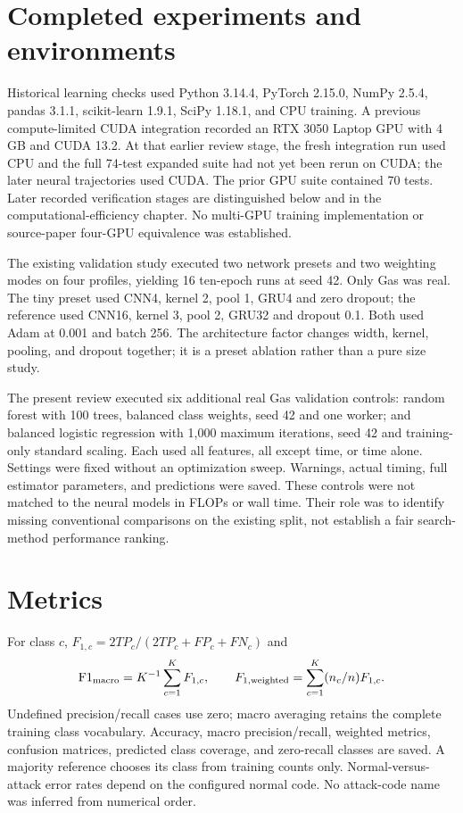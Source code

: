 \documentclass[11pt,a4paper]{report}
\begin{document}
\section{Completed experiments and environments}
Historical learning checks used Python 3.14.4, PyTorch 2.15.0, NumPy 2.5.4, pandas 3.1.1, scikit-learn 1.9.1, SciPy 1.18.1, and CPU training. A previous compute-limited CUDA integration recorded an RTX 3050 Laptop GPU with 4 GB and CUDA 13.2. At that earlier review stage, the fresh integration run used CPU and the full 74-test expanded suite had not yet been rerun on CUDA; the later neural trajectories used CUDA. The prior GPU suite contained 70 tests. Later recorded verification stages are distinguished below and in the computational-efficiency chapter. No multi-GPU training implementation or source-paper four-GPU equivalence was established.

The existing validation study executed two network presets and two weighting modes on four profiles, yielding 16 ten-epoch runs at seed 42. Only Gas was real. The tiny preset used CNN4, kernel 2, pool 1, GRU4 and zero dropout; the reference used CNN16, kernel 3, pool 2, GRU32 and dropout 0.1. Both used Adam at 0.001 and batch 256. The architecture factor changes width, kernel, pooling, and dropout together; it is a preset ablation rather than a pure size study.

The present review executed six additional real Gas validation controls: random forest with 100 trees, balanced class weights, seed 42 and one worker; and balanced logistic regression with 1,000 maximum iterations, seed 42 and training-only standard scaling. Each used all features, all except time, or time alone. Settings were fixed without an optimization sweep. Warnings, actual timing, full estimator parameters, and predictions were saved. These controls were not matched to the neural models in FLOPs or wall time. Their role was to identify missing conventional comparisons on the existing split, not establish a fair search-method performance ranking.

\section{Metrics}
For class $c$, $F_{1,c}=2TP_c/(2TP_c+FP_c+FN_c)$ and
\begin{equation}\mathrm{F1}_{\mathrm{macro}}=K^{-1}\sum_{c=1}^K F_{1,c},\qquad
 F_{1,\rm weighted}=\sum_{c=1}^K (n_c/n)F_{1,c}.
\end{equation}
Undefined precision/recall cases use zero; macro averaging retains the complete training class vocabulary. Accuracy, macro precision/recall, weighted metrics, confusion matrices, predicted class coverage, and zero-recall classes are saved. A majority reference chooses its class from training counts only. Normal-versus-attack error rates depend on the configured normal code. No attack-code name was inferred from numerical order.
\end{document}
